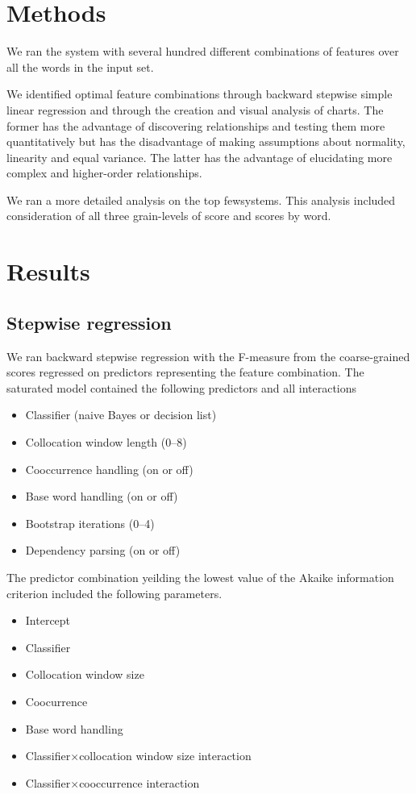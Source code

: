 \documentclass{article}
\begin{document}
\section{Methods}
\newcommand\few{few}

We ran the system with several hundred different combinations of features over
all the words in the input set.

We identified optimal feature combinations through backward stepwise simple
linear regression and through the creation and visual analysis of charts. The
former has the advantage of discovering relationships and testing them more
quantitatively but has the disadvantage of making assumptions about normality,
linearity and equal variance.  The latter has the advantage of elucidating more
complex and higher-order relationships.

We ran a more detailed analysis on the top \few systems.  This analysis included
consideration of all three grain-levels of score and scores by word.

\section{Results}

\subsection{Stepwise regression}

We ran backward stepwise regression with the F-measure from the coarse-grained
scores regressed on predictors representing the feature combination.  The
saturated model contained the following predictors and all interactions

\begin{itemize}
\item Classifier (naive Bayes or decision list)
\item Collocation window length (0--8)
\item Cooccurrence handling (on or off)
\item Base word handling (on or off)
\item Bootstrap iterations (0--4)
\item Dependency parsing (on or off)
\end{itemize}

The predictor combination yeilding the lowest value of the Akaike information criterion
included the following parameters.

\begin{itemize}
\item Intercept
\item Classifier
\item Collocation window size
\item Coocurrence
\item Base word handling
\item Classifier$\times$collocation window size interaction
\item Classifier$\times$cooccurrence interaction
\end{itemize}
\end{document}
